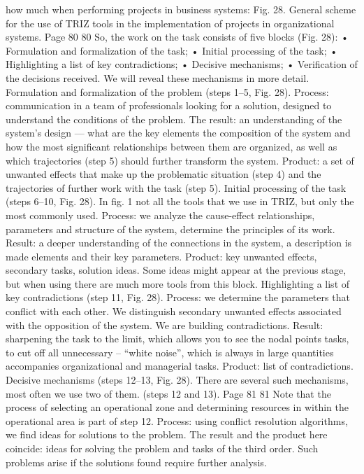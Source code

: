 how much when performing projects in business systems:
Fig. 28. General scheme for the use of TRIZ tools in the implementation of projects in
organizational systems.
Page 80
80
So, the work on the task consists of five blocks (Fig. 28):
• Formulation and formalization of the task;
• Initial processing of the task;
• Highlighting a list of key contradictions;
• Decisive mechanisms;
• Verification of the decisions received.
We will reveal these mechanisms in more detail.
Formulation and formalization of the problem (steps 1–5, Fig. 28).
Process: communication in a team of professionals looking for a solution, designed
to understand the conditions of the problem.
The result: an understanding of the system’s design — what are the key elements
the composition of the system and how the most significant relationships between them are organized, as well as
which trajectories (step 5) should further transform the system.
Product: a set of unwanted effects that make up the problematic
situation (step 4) and the trajectories of further work with the task (step 5).
Initial processing of the task (steps 6–10, Fig. 28).
In fig. 1 not all the tools that we use in
TRIZ, but only the most commonly used.
Process: we analyze the cause-effect relationships, parameters and
structure of the system, determine the principles of its work.
Result: a deeper understanding of the connections in the system, a description is made
elements and their key parameters.
Product: key unwanted effects, secondary tasks, solution ideas.
Some ideas might appear at the previous stage, but when using
there are much more tools from this block.
Highlighting a list of key contradictions (step 11, Fig. 28).
Process: we determine the parameters that conflict with each other.
We distinguish secondary unwanted effects associated with the opposition of the system.
We are building contradictions.
Result: sharpening the task to the limit, which allows you to see the nodal points
tasks, to cut off all unnecessary -- “white noise”, which is always in large quantities
accompanies organizational and managerial tasks.
Product: list of contradictions.
Decisive mechanisms (steps 12–13, Fig. 28).
There are several such mechanisms, most often we use two of them.
(steps 12 and 13).
Page 81
81
Note that the process of selecting an operational zone and determining resources in
within the operational area is part of step 12.
Process: using conflict resolution algorithms, we find ideas for
solutions to the problem.
The result and the product here coincide: ideas for solving the problem and tasks of the third
order. Such problems arise if the solutions found require further analysis.
